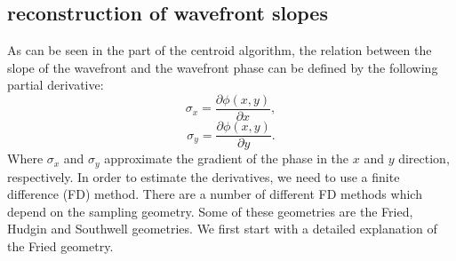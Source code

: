 \documentclass{article}
\begin{document}
\subsection{reconstruction of wavefront slopes}
As can be seen in the part of the centroid algorithm, the relation between the slope of the wavefront and the wavefront phase can be defined by the following partial derivative:
$$ \sigma_x = \frac{\partial\phi(x,y)}{\partial x},$$ 
$$ \sigma_y = \frac{\partial\phi(x,y)}{\partial y}.$$ 
Where $\sigma_x$ and $\sigma_y$ approximate the gradient of the phase in the $x$ and $y$ direction, respectively.
In order to estimate the derivatives, we need to use a finite difference (FD) method. There are a number of different FD methods which depend on the sampling geometry. Some of these geometries are the Fried\cite{fried1977least}, Hudgin\cite{hudgin1977wave} and Southwell\cite{southwell1980wave} geometries. We first start with a detailed explanation of the Fried geometry.
\end{document}
